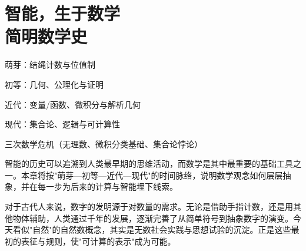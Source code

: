 \chapter{智能，生于数学 \texorpdfstring{\\}{ }简明数学史}
\newenvironment{examplebox}
{\par\vspace{0.5em}\noindent\hrulefill\par\noindent{示例盒子：三跳链}\par\small}
{\par\noindent\hrulefill\vspace{0.5em}\normalsize\par}

\begin{introduction}
\item 萌芽：结绳计数与位值制
\item 初等：几何、公理化与证明
\item 近代：变量/函数、微积分与解析几何
\item 现代：集合论、逻辑与可计算性
\item 三次数学危机（无理数、微积分类基础、集合论悖论）

\end{introduction}


智能的历史可以追溯到人类最早期的思维活动，而数学是其中最重要的基础工具之一。本章将按"萌芽—初等—近代—现代"的时间脉络，说明数学观念如何层层抽象，并在每一步为后来的计算与智能埋下线索。

对于古代人来说，数字的发明源于对数量的需求。无论是借助手指计数，还是用其他物体辅助，人类通过千年的发展，逐渐完善了从简单符号到抽象数字的演变。今天看似"自然"的自然数概念，其实是无数社会实践与思想试验的沉淀。正是这些最初的表征与规则，使"可计算的表示"成为可能。

